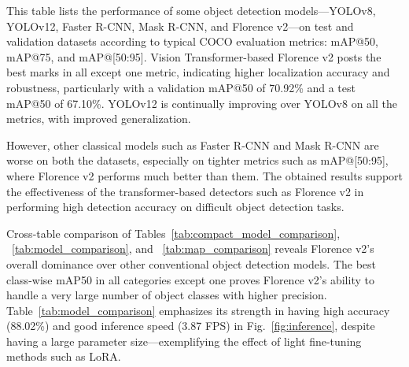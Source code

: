 \documentclass[fleqn,10pt,lineno]{wlpeerj}
\begin{document}
This table lists the performance of some object detection models—YOLOv8, YOLOv12, Faster R-CNN, Mask R-CNN, and Florence v2—on test and validation datasets according to typical COCO evaluation metrics: mAP@50, mAP@75, and mAP@[50:95]. Vision Transformer-based Florence v2 posts the best marks in all except one metric, indicating higher localization accuracy and robustness, particularly with a validation mAP@50 of 70.92\% and a test mAP@50 of 67.10\%. YOLOv12 is continually improving over YOLOv8 on all the metrics, with improved generalization. 

However, other classical models such as Faster R-CNN and Mask R-CNN are worse on both the datasets, especially on tighter metrics such as mAP@[50:95], where Florence v2 performs much better than them. The obtained results support the effectiveness of the transformer-based detectors such as Florence v2 in performing high detection accuracy on difficult object detection tasks.

\begin{table}[H]
\centering
\caption{Evaluation of Detection Performance on Validation and Test Datasets}
\small
\renewcommand{\arraystretch}{1.2}
\setlength{\tabcolsep}{4pt}
\label{tab:map_comparison}
\end{table}

Cross-table comparison of Tables~\ref{tab:compact_model_comparison}, ~\ref{tab:model_comparison}, and ~\ref{tab:map_comparison} reveals Florence v2's overall dominance over other conventional object detection models. The best class-wise mAP50 in all categories except one proves Florence v2's ability to handle a very large number of object classes with higher precision. Table~\ref{tab:model_comparison} emphasizes its strength in having high accuracy (88.02\%) and good inference speed (3.87 FPS) in Fig.~\ref{fig:inference}, despite having a large parameter size—exemplifying the effect of light fine-tuning methods such as LoRA.
\end{document}
